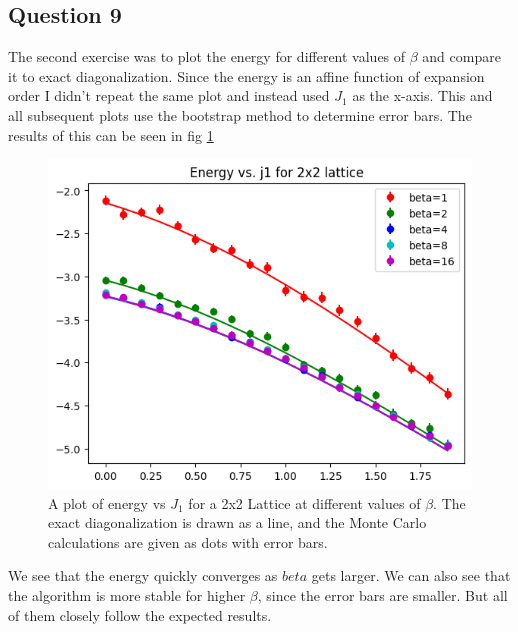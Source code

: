\documentclass[ngerman]{scrartcl}
\begin{document}
\subsection*{Question 9}
The second exercise was to plot the energy for different values of $\beta$ and compare it to exact diagonalization. Since the energy is an affine function of expansion order I didn't repeat the same plot and instead used $J_1$ as the x-axis.
This and all subsequent plots use the bootstrap method to determine error bars. The results of this can be seen in fig \ref{fig:energy}
\begin{figure}[H]
        \centering
        \includegraphics[width=1.0\textwidth]{energy.png}
        \caption{A plot of energy vs $J_1$ for a 2x2 Lattice at different values of $\beta$. The exact diagonalization is drawn as a line, and the Monte Carlo calculations are given as dots with error bars.}
        \label{fig:energy}
    \end{figure}
We see that the energy quickly converges as $beta$ gets larger. We can also see that the algorithm is more stable for higher $\beta$, since the error bars are smaller. But all of them closely follow the expected results.
\end{document}
